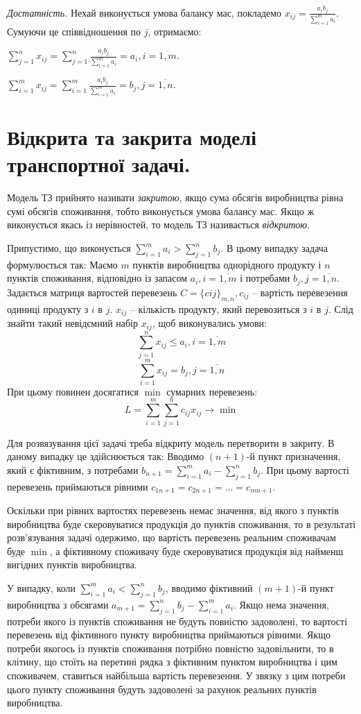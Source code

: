 \documentclass[12pt,a4paper]{report}
\begin{document}
{\it Достатність.} Нехай виконується умова балансу мас, покладемо  $x_{ij} = \frac{a_ib_j}{\sum_{i=1}^m a_i}$. Сумуючи це співвідношення по $j$, отримаємо:

$\sum_{j=1}^n x_{ij} = \sum_{j=1}^n \frac{a_ib_j}{\sum_{i=1}^m a_i} = a_i,  i = \overline{1, m}.$

$\sum_{i=1}^m x_{ij} = \sum_{i=1}^m \frac{a_ib_j}{\sum_{i=1}^m a_i} = b_j,  j = \overline{1, n}.$

\clearpage

\chapter{Відкрита та закрита моделі транспортної задачі.}

Модель ТЗ прийнято називати \emph{закритою}, якщо сума обсягів виробництва рівна сумі обсягів споживання, тобто виконується умова балансу мас. Якщо ж виконується якась із нерівностей, то модель ТЗ називається \emph{відкритою}.

Припустимо, що виконується $\sum_{i=1}^m a_i > \sum_{j=1}^n b_j$. В цьому випадку задача формулюється так:
Маємо $m$ пунктів виробництва однорідного продукту і $n$ пунктів споживання, відповідно із запасом $a_i, i=\overline{1,m}$ і потребами $b_j, j=\overline{1,n}$. Задається матриця вартостей перевезень $C=\{cij\}_{m,n}, c_{ij}$ – вартість перевезення одиниці продукту з $i$ в $j$. $x_{ij}$ – кількість продукту, який перевозиться з $i$ в $j$.
Слід знайти такий невідємний набір $x_{ij}$, щоб виконувались умови:
\[ \sum_{j=1}^n x_{ij} \leq a_i, i=\overline{1,m} \]
\[ \sum_{i=1}^m x_{ij} = b_j, j=\overline{1,n} \]
При цьому повинен досягатися $\min$ сумарних перевезень:
\[ L = \sum_{i=1}^m \sum_{j=1}^n c_{ij} x_{ij} \to \min \]

Для розвязування цієї задачі треба відкриту модель перетворити в закриту. В даному випадку це здійснюється так:
Вводимо $(n+1)$-й пункт призначення, який є фіктивним, з потребами $b_{n+1} = \sum_{i=1}^m a_i - \sum_{j=1}^n b_j$. При цьому вартості перевезень приймаються рівними $c_{1 n+1} = c_{2 n+1} = \dots = c_{m n+1}$.

Оскільки при рівних вартостях перевезень немає значення, від якого з пунктів виробництва буде скеровуватися продукція до пунктів споживання, то в результаті розв’язування задачі одержимо, що вартість перевезень реальним споживачам буде $\min$, а фіктивному споживачу буде скеровуватися продукція від найменш вигідних пунктів виробництва.

У випадку, коли $\sum_{i=1}^m a_i < \sum_{j=1}^n b_j$, вводимо фіктивний $(m+1)$-й пункт виробництва з обсягами $a_{m+1} = \sum_{j=1}^n b_j - \sum_{i=1}^m a_i$. Якщо нема значення, потреби якого із пунктів споживання не будуть повністю задоволені, то вартості перевезень від фіктивного пункту виробництва приймаються рівними. Якщо потреби якогось із пунктів споживання потрібно повністю задовільнити, то в клітину, що стоїть на перетині рядка з фіктивним пунктом виробництва і цим споживачем, ставиться найбільша вартість перевезення. У звязку з цим потреби цього пункту споживання будуть задоволені за рахунок реальних пунктів виробництва.
\end{document}
